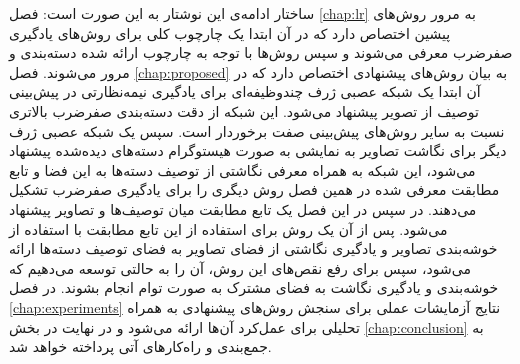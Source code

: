  ساختار ادامه‌ی این نوشتار به این صورت است:  فصل \ref{chap:lr} به مرور روش‌های پیشین اختصاص دارد که در آن ابتدا یک چارچوب کلی برای روش‌های یادگیری صفرضرب معرفی می‌شوند و سپس روش‌ها با توجه به چارچوب ارائه شده دسته‌بندی و مرور می‌شوند. فصل \ref{chap:proposed} به بیان روش‌های پیشنهادی اختصاص دارد که در آن ابتدا یک شبکه عصبی ژرف چندوظیفه‌ای برای یادگیری نیمه‌نظارتی در پیش‌بینی توصیف از تصویر پیشنهاد می‌شود. این شبکه از دقت دسته‌بندی صفرضرب بالاتری نسبت به سایر روش‌های پیش‌بینی صفت برخوردار است. سپس یک شبکه عصبی ژرف دیگر برای نگاشت تصاویر به نمایشی به صورت هیستوگرام دسته‌های دیده‌شده پیشنهاد می‌شود، این شبکه به همراه معرفی نگاشتی از توصیف دسته‌ها به این فضا و تابع مطابقت معرفی شده در همین فصل روش دیگری را برای یادگیری صفرضرب تشکیل می‌دهند.  در سپس در این فصل یک تابع مطابقت میان توصیف‌ها و تصاویر پیشنهاد می‌شود. پس از آن یک روش برای استفاده از این تابع مطابقت با استفاده از خوشه‌بندی تصاویر و یادگیری نگاشتی از فضای تصاویر به فضای توصیف دسته‌ها ارائه می‌شود، سپس برای رفع نقص‌های این روش، آن را به حالتی توسعه می‌دهیم که خوشه‌بندی و یادگیری نگاشت به فضای مشترک به صورت توام انجام بشوند. در فصل
 \ref{chap:experiments}
نتایج آزمایشات عملی برای سنجش روش‌های پیشنهادی به همراه تحلیلی برای عمل‌کرد آن‌ها ارائه می‌شود و در نهایت در بخش \ref{chap:conclusion} به جمع‌بندی و راه‌کارهای آتی پرداخته خواهد شد.
